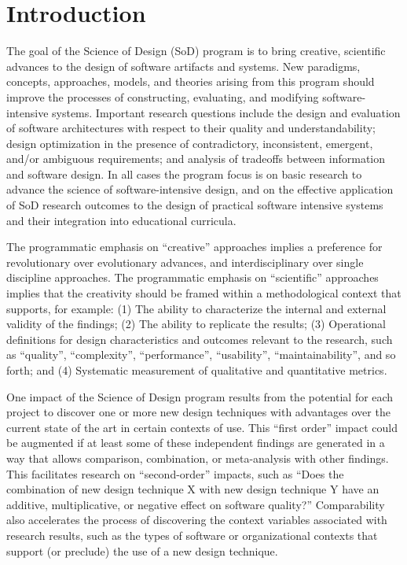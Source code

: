 
\section{Introduction}

The goal of the Science of Design (SoD) program is to bring creative,
scientific advances to the design of software artifacts and systems.  New
paradigms, concepts, approaches, models, and theories arising from this
program should improve the processes of constructing, evaluating, and
modifying software-intensive systems. Important research questions include
the design and evaluation of software architectures with respect to their
quality and understandability; design optimization in the presence of
contradictory, inconsistent, emergent, and/or ambiguous requirements; and
analysis of tradeoffs between information and software design.  In all
cases the program focus is on basic research to advance the science of
software-intensive design, and on the effective application of SoD research
outcomes to the design of practical software intensive systems and their
integration into educational curricula.

The programmatic emphasis on ``creative'' approaches implies a preference
for revolutionary over evolutionary advances, and interdisciplinary over
single discipline approaches.  The programmatic emphasis on ``scientific''
approaches implies that the creativity should be framed within a
methodological context that supports, for example: (1) The ability to
characterize the internal and external validity of the findings; (2) The
ability to replicate the results; (3) Operational definitions for design
characteristics and outcomes relevant to the research, such as ``quality'',
``complexity'', ``performance'', ``usability'', ``maintainability'', and so
forth; and (4) Systematic measurement of qualitative and quantitative
metrics.

One impact of the Science of Design program results from the potential for
each project to discover one or more new design techniques with advantages
over the current state of the art in certain contexts of use.  This ``first
order'' impact could be augmented if at least some of these independent
findings are generated in a way that allows comparison,
combination, or meta-analysis with other findings.  This
facilitates  research on ``second-order'' impacts, such as
``Does the combination of new design technique X with new design technique
Y have an additive, multiplicative, or negative effect on software
quality?''  Comparability also accelerates the process of discovering the
context variables associated with research results, such as the types of
software or organizational contexts that support (or preclude) the use of a
new design technique.

